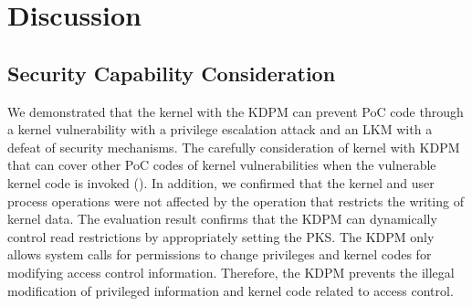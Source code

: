 \section{Discussion}  \label{section:discussion}
\subsection{Security Capability Consideration}
We demonstrated that the kernel with the KDPM can prevent PoC code through a
kernel vulnerability with a privilege escalation attack and an LKM with a defeat
of security mechanisms.
%
The carefully consideration of kernel with KDPM that can cover other PoC
codes of kernel vulnerabilities when the vulnerable kernel code is invoked
().
%
%
%
%
In addition, we confirmed that the kernel and user process operations were not
affected by the operation that restricts the writing of kernel data. 
%
The evaluation result confirms that the KDPM can
dynamically control read restrictions by appropriately setting the PKS.
%
The KDPM only allows system calls for permissions to change privileges
and kernel codes for modifying access control information.
%
Therefore, the KDPM prevents the illegal modification of privileged information
and kernel code related to access control.


